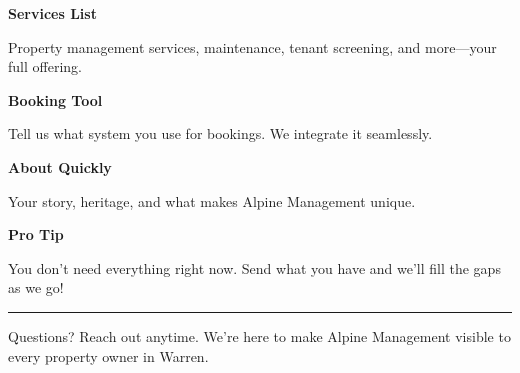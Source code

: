 \documentclass[11pt,letterpaper]{article}
\begin{document}
\begin{minipage}[t]{0.48\textwidth}
\begin{tcolorbox}[colframe=accent-teal, boxrule=1pt, left=0.7em, right=0.7em, top=0.5em, bottom=0.5em, arc=4pt, boxsep=0pt]
{\bfseries\small\color{accent-teal}Services List}

\vspace{0.15em}

{\small Property management services, maintenance, tenant screening, and more—your full offering.}
\end{tcolorbox}

\vspace{0.1em}

\begin{tcolorbox}[colframe=accent-teal, boxrule=1pt, left=0.7em, right=0.7em, top=0.5em, bottom=0.5em, arc=4pt, boxsep=0pt]
{\bfseries\small\color{accent-teal}Booking Tool}

\vspace{0.15em}

{\small Tell us what system you use for bookings. We integrate it seamlessly.}
\end{tcolorbox}

\vspace{0.1em}

\begin{tcolorbox}[colframe=accent-teal, boxrule=1pt, left=0.7em, right=0.7em, top=0.5em, bottom=0.5em, arc=4pt, boxsep=0pt]
{\bfseries\small\color{accent-teal}About Quickly}

\vspace{0.15em}

{\small Your story, heritage, and what makes Alpine Management unique.}
\end{tcolorbox}

\vspace{-0.2em}
\end{minipage}

\vspace{0.15em}

\begin{tcolorbox}[colback={accent-red!5}, colframe=accent-red!20, boxrule=0.5pt, left=0.7em, right=0.7em, top=0.4em, bottom=0.4em, arc=6pt, boxsep=0pt]

{\bfseries\small\color{accent-red}Pro Tip}

\vspace{0.1em}

{\small You don't need everything right now. Send what you have and we'll fill the gaps as we go!}

\end{tcolorbox}

\vspace{0.15em}

\noindent\hrule
\vspace{0.2em}

{\small\color{text-light}Questions? Reach out anytime. We're here to make Alpine Management visible to every property owner in Warren.}
\end{document}
